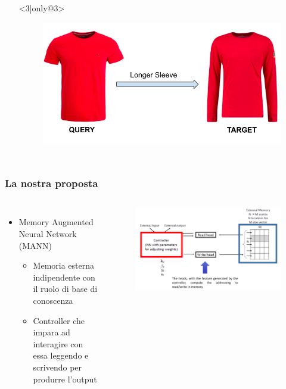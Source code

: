 \documentclass{beamer}
\begin{document}
\begin{frame}
\begin{columns}
\begin{itemize}
\begin{figure}[!h]
\begin{center}
 			\end{center}
 		\end{figure}
 	\item[] <3|only@3> 
		\begin{figure}[!h]
 			\begin{center}
 			\includegraphics[scale=0.22]{"Immagini/One_Manipulation.png"}
 			\end{center}
 		\end{figure}
\end{itemize}
\end{columns}
\end{frame}

\begin{frame}
\frametitle{La nostra proposta}
\begin{columns}
\begin{itemize} 
\item <1-> Memory Augmented Neural Network (MANN)
\begin{itemize} 
	\item <2-> Memoria esterna indipendente con il ruolo di base di conoscenza
	\item <3-> Controller che impara ad interagire con essa leggendo e scrivendo per produrre l'output
\end{itemize}
\end{itemize}

		\begin{figure}[!h]
 			\begin{center}
 			\includegraphics[scale=0.18]{"Immagini/MANN.png"}
 			\end{center}
 		\end{figure}
\end{columns}
\end{frame}
\end{document}
